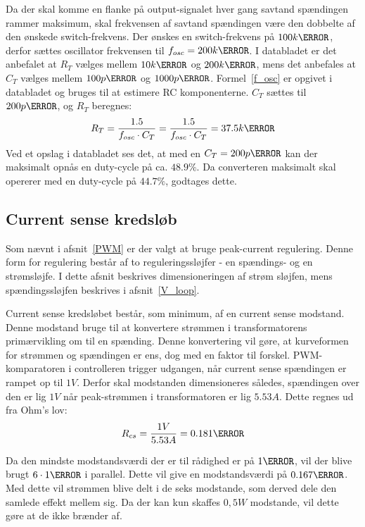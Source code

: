 Da der skal komme en flanke på output-signalet hver gang savtand spændingen rammer maksimum, skal frekvensen af savtand spændingen være den dobbelte af den ønskede switch-frekvens. Der ønskes en switch-frekvens på $100k\hertz$, derfor sættes oscillator frekvensen til $f_{osc}=200k\hertz$. I databladet er det anbefalet at $R_T$ vælges mellem $10k\ohm$ og $200k\ohm$, mens det anbefales at $C_T$ vælges mellem $100p\farad$ og $1000p\farad$. Formel~\ref{f_osc} er opgivet i databladet og bruges til at estimere RC komponenterne. $C_T$ sættes til $200p\farad$, og $R_T$ beregnes:
\begin{equation} \label{f_osc}
R_{T} = \frac{1.5}{f_{osc} \cdot C_T} = \frac{1.5}{f_{osc} \cdot C_T} = 37.5k\ohm
\end{equation}
Ved et opslag i databladet ses det, at med en $C_T=200p\farad$ kan der maksimalt opnås en duty-cycle på ca. $48.9\percent$. Da converteren maksimalt skal opererer med en duty-cycle på $44.7\percent$, godtages dette.

\subsection{Current sense kredsløb} \label{CS_loop}
Som nævnt i afsnit~\ref{PWM} er der valgt at bruge peak-current regulering. Denne form for regulering består af to reguleringssløjfer - en spændings- og en strømsløjfe. I dette afsnit beskrives dimensioneringen af strøm sløjfen, mens spændingssløjfen beskrives i afsnit~\ref{V_loop}.

Current sense kredsløbet består, som minimum, af en current sense modstand. Denne modstand bruge til at konvertere strømmen i transformatorens primærvikling om til en spænding. Denne konvertering vil gøre, at kurveformen for strømmen og spændingen er ens, dog med en faktor til forskel. PWM-komparatoren i controlleren trigger udgangen, når current sense spændingen er rampet op til $1V$. Derfor skal modstanden dimensioneres således, spændingen over den er lig $1V$ når peak-strømmen i transformatoren er lig $5.53A$. Dette regnes ud fra Ohm's lov:
\begin{equation} \label{R_cs}
R_{cs} = \frac{1V}{5.53A} = 0.181\ohm
\end{equation}

Da den mindste modstandsværdi der er til rådighed er på $1\ohm$, vil der blive brugt $6\cdot 1\ohm$ i parallel. Dette vil give en modstandsværdi på $0.167\ohm$. Med dette vil strømmen blive delt i de seks modstande, som derved dele den samlede effekt mellem sig. Da der kan kun skaffes $0,5W$ modstande, vil dette gøre at de ikke brænder af. 

